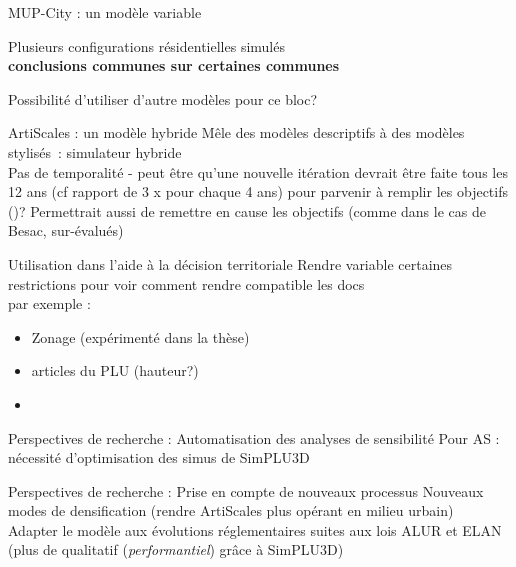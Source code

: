 \documentclass[xcolor=table]{beamer}
\begin{document}
\begin{frame}{MUP-City : un modèle variable}
	\begin{block}{}
		Plusieurs configurations résidentielles simulés
		\\
		\textbf{conclusions communes sur certaines communes}
	\end{block}
	
	\begin{block}{}
		Possibilité d'utiliser d'autre modèles pour ce bloc? 
	\end{block}
\end{frame}

\begin{frame}{ArtiScales : un modèle hybride}
Mêle des modèles descriptifs à des modèles stylisés~: simulateur hybride
\\
Pas de temporalité - peut être qu'une nouvelle itération devrait être faite tous les 12 ans (cf rapport de 3 x pour chaque 4 ans) pour parvenir à remplir les objectifs ()?
Permettrait aussi de remettre en cause les objectifs (comme dans le cas de Besac, sur-évalués)
		
\end{frame}


\begin{frame}{Utilisation dans l'aide à la décision territoriale}
	Rendre variable certaines restrictions pour voir comment rendre compatible les docs
\\
	par exemple : 
	\begin{itemize}
		\item Zonage (expérimenté dans la thèse)
		\item articles du PLU (hauteur?)
		\item 
	\end{itemize}
\end{frame}

\begin{frame}{Perspectives de recherche : Automatisation des analyses de sensibilité}
	Pour AS : nécessité d'optimisation des simus de SimPLU3D
\end{frame}

\begin{frame}{Perspectives de recherche : Prise en compte de nouveaux processus}
	Nouveaux modes de densification (rendre ArtiScales plus opérant en milieu urbain)
	\\
	Adapter le modèle aux évolutions réglementaires suites aux lois ALUR et ELAN (plus de qualitatif (\textit{performantiel}) grâce à SimPLU3D)
\end{frame}
\end{document}
